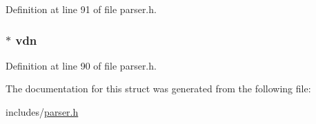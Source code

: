 Definition at line 91 of file parser.\+h.

\hypertarget{structvariable__declare__ast__node_ac1fcaa71348864544823e2a73cc23a26}{
\subsubsection[{vdn}]{$\ast$ vdn}}\label{structvariable__declare__ast__node_ac1fcaa71348864544823e2a73cc23a26}


Definition at line 90 of file parser.\+h.



The documentation for this struct was generated from the following file\+:\begin{DoxyCompactItemize}
\item 
includes/\hyperlink{parser_8h}{parser.\+h}\end{DoxyCompactItemize}
